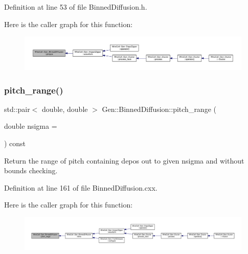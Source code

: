 Definition at line 53 of file Binned\+Diffusion.\+h.

Here is the caller graph for this function\+:
\nopagebreak
\begin{figure}[H]
\begin{center}
\leavevmode
\includegraphics[width=350pt]{class_wire_cell_1_1_gen_1_1_binned_diffusion_acdc13c03fa55ddc92c6cd134d07b6bf3_icgraph}
\end{center}
\end{figure}
\mbox{\label{class_wire_cell_1_1_gen_1_1_binned_diffusion_a8a3bc23cc2d3ba5a36bd742788920271}} 
\subsubsection{\texorpdfstring{pitch\+\_\+range()}{pitch\_range()}}
{\footnotesize\ttfamily std\+::pair$<$ double, double $>$ Gen\+::\+Binned\+Diffusion\+::pitch\+\_\+range (\begin{DoxyParamCaption}\item[{double}]{nsigma = {} }\end{DoxyParamCaption}) const}

Return the range of pitch containing depos out to given nsigma and without bounds checking. 

Definition at line 161 of file Binned\+Diffusion.\+cxx.

Here is the caller graph for this function\+:
\nopagebreak
\begin{figure}[H]
\begin{center}
\leavevmode
\includegraphics[width=350pt]{class_wire_cell_1_1_gen_1_1_binned_diffusion_a8a3bc23cc2d3ba5a36bd742788920271_icgraph}
\end{center}
\end{figure}
\mbox{\label{class_wire_cell_1_1_gen_1_1_binned_diffusion_add5e00394c16a9fc27be4b7d617fa59b}} 
